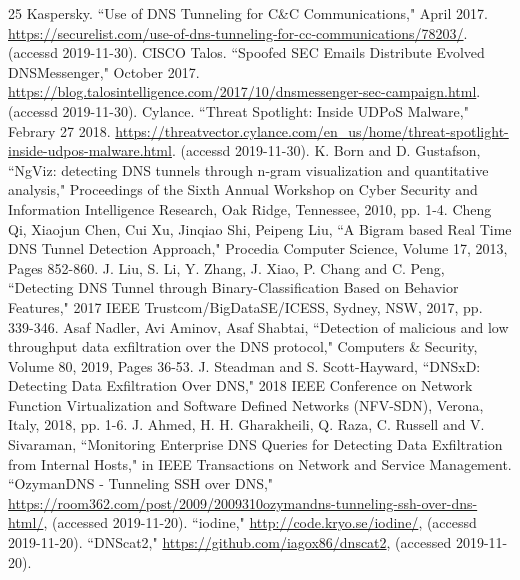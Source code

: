 \documentclass[12pt]{jarticle} %
\begin{document}
\begin{thebibliography} {25}
  Kaspersky. ``Use of DNS Tunneling for C\&C Communications," April 2017. \href{https://securelist.com/use-of-dns-tunneling-for-cc-communications/78203/}{https://securelist.com/use-of-dns-tunneling-for-cc-communications/78203/}. (accessd 2019-11-30).
  CISCO Talos. ``Spoofed SEC Emails Distribute Evolved DNSMessenger," October 2017. \href{https://blog.talosintelligence.com/2017/10/dnsmessenger-sec-campaign.html}{https://blog.talosintelligence.com/2017/10/dnsmessenger-sec-campaign.html}. (accessd 2019-11-30).
  Cylance. ``Threat Spotlight: Inside UDPoS Malware," Febrary 27 2018. \href{https://threatvector.cylance.com/en\_us/home/threat-spotlight-inside-udpos-malware.html}{https://threatvector.cylance.com/en\_us/home/threat-spotlight-inside-udpos-malware.html}. (accessd 2019-11-30).
  K. Born and D. Gustafson, ``NgViz: detecting DNS tunnels through n-gram visualization and quantitative analysis," Proceedings of the Sixth Annual Workshop on Cyber Security and Information Intelligence Research, Oak Ridge, Tennessee, 2010, pp. 1-4.
  Cheng Qi, Xiaojun Chen, Cui Xu, Jinqiao Shi, Peipeng Liu, ``A Bigram based Real Time DNS Tunnel Detection Approach," Procedia Computer Science, Volume 17, 2013, Pages 852-860.
  J. Liu, S. Li, Y. Zhang, J. Xiao, P. Chang and C. Peng, ``Detecting DNS Tunnel through Binary-Classification Based on Behavior Features," 2017 IEEE Trustcom/BigDataSE/ICESS, Sydney, NSW, 2017, pp. 339-346.
  Asaf Nadler, Avi Aminov, Asaf Shabtai, ``Detection of malicious and low throughput data exfiltration over the DNS protocol," Computers \& Security, Volume 80, 2019, Pages 36-53.
  J. Steadman and S. Scott-Hayward, ``DNSxD: Detecting Data Exfiltration Over DNS," 2018 IEEE Conference on Network Function Virtualization and Software Defined Networks (NFV-SDN), Verona, Italy, 2018, pp. 1-6.
  J. Ahmed, H. H. Gharakheili, Q. Raza, C. Russell and V. Sivaraman, ``Monitoring Enterprise DNS Queries for Detecting Data Exfiltration from Internal Hosts," in IEEE Transactions on Network and Service Management.
  ``OzymanDNS - Tunneling SSH over DNS," \href{https://room362.com/post/2009/2009310ozymandns-tunneling-ssh-over-dns-html/}{https://room362.com/post/2009/2009310ozymandns-tunneling-ssh-over-dns-html/}, (accessed 2019-11-20).
  ``iodine," \href{http://code.kryo.se/iodine/}{http://code.kryo.se/iodine/}, (accessd 2019-11-20).
  ``DNScat2," \href{https://github.com/iagox86/dnscat2}{https://github.com/iagox86/dnscat2}, (accessed 2019-11-20).
\end{thebibliography}

\end{document}
